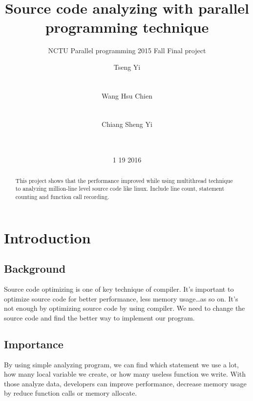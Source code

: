 \documentclass{acm_proc_article-sp}
\begin{document}
\title{Source code analyzing with parallel programming technique}
\subtitle{NCTU Parallel programming 2015 Fall Final project}

\author{
\alignauthor
Tseng Yi\\
       \\
       \\
\alignauthor
Wang Hsu Chien\\
       \\
       \\
\alignauthor
Chiang Sheng Yi\\
       \\
       \\
}

\date{1 19 2016}

\maketitle
\begin{abstract}
       This project shows that the performance improved while using multithread technique
       to analyzing million-line level source code like linux. Include line count, statement counting
       and function call recording.
\end{abstract}


\section{Introduction}
\subsection{Background}
       Source code optimizing is one of key technique of compiler. 
       It's important to optimize source code for better performance, 
       less memory usage\ldots as so on. It's not enough by optimizing 
       source code by using compiler. We need to change the source 
       code and find the better way to implement our program. 
\subsection{Importance}
	By using simple analyzing program, we can find which statement we 
	use a lot, how many local variable we create, or how many useless 
	function we write. With those analyze data, developers can improve performance,
	decrease memory usage by reduce function calls or memory allocate.
\end{document}
